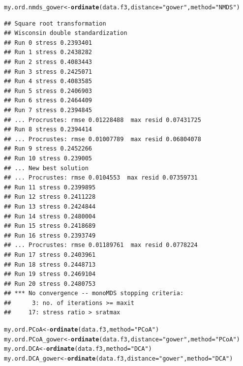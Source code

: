 \documentclass[12pt]{article}\usepackage[]{graphicx}\usepackage[]{color}
\makeatletter
\newcommand{\hlstr}[1]{\textcolor[rgb]{0.192,0.494,0.8}{#1}}%
\newcommand{\hlstd}[1]{\textcolor[rgb]{0.345,0.345,0.345}{#1}}%
\newcommand{\hlkwb}[1]{\textcolor[rgb]{0.69,0.353,0.396}{#1}}%
\newcommand{\hlkwc}[1]{\textcolor[rgb]{0.333,0.667,0.333}{#1}}%
\newcommand{\hlkwd}[1]{\textcolor[rgb]{0.737,0.353,0.396}{\textbf{#1}}}%
\newenvironment{kframe}{%
 \def\at@end@of@kframe{}%
 \ifinner\ifhmode%
  \def\at@end@of@kframe{\end{minipage}}%
  \begin{minipage}{\columnwidth}%
 \fi\fi%
 \def\FrameCommand##1{\hskip\@totalleftmargin \hskip-\fboxsep
 \colorbox{shadecolor}{##1}\hskip-\fboxsep
     \hskip-\linewidth \hskip-\@totalleftmargin \hskip\columnwidth}%
 \MakeFramed {\advance\hsize-\width
   \@totalleftmargin\z@ \linewidth\hsize
   \@setminipage}}%
 {\par\unskip\endMakeFramed%
 \at@end@of@kframe}
\newenvironment{knitrout}{}{} %
\numberwithin{figure}{section}
\makeatother
\begin{document}
\begin{knitrout}\small
{}\color{fgcolor}\begin{kframe}
\begin{alltt}
\hlstd{my.ord.nmds_gower} \hlkwb{<-} \hlkwd{ordinate}\hlstd{(data.f3,} \hlkwc{distance} \hlstd{=} \hlstr{"gower"}\hlstd{,}  \hlkwc{method} \hlstd{=} \hlstr{"NMDS"}\hlstd{)}
\end{alltt}
\begin{verbatim}
## Square root transformation
## Wisconsin double standardization
## Run 0 stress 0.2393401 
## Run 1 stress 0.2438282 
## Run 2 stress 0.4083443 
## Run 3 stress 0.2425071 
## Run 4 stress 0.4083585 
## Run 5 stress 0.2406903 
## Run 6 stress 0.2464409 
## Run 7 stress 0.2394845 
## ... Procrustes: rmse 0.01228488  max resid 0.07431725 
## Run 8 stress 0.2394414 
## ... Procrustes: rmse 0.01007789  max resid 0.06804078 
## Run 9 stress 0.2452266 
## Run 10 stress 0.239005 
## ... New best solution
## ... Procrustes: rmse 0.0104553  max resid 0.07359731 
## Run 11 stress 0.2399895 
## Run 12 stress 0.2411228 
## Run 13 stress 0.2424844 
## Run 14 stress 0.2480004 
## Run 15 stress 0.2418689 
## Run 16 stress 0.2393749 
## ... Procrustes: rmse 0.01189761  max resid 0.0778224 
## Run 17 stress 0.2403961 
## Run 18 stress 0.2448713 
## Run 19 stress 0.2469104 
## Run 20 stress 0.2480753 
## *** No convergence -- monoMDS stopping criteria:
##      3: no. of iterations >= maxit
##     17: stress ratio > sratmax
\end{verbatim}
\begin{alltt}
\hlstd{my.ord.PCoA} \hlkwb{<-} \hlkwd{ordinate}\hlstd{(data.f3,} \hlkwc{method} \hlstd{=} \hlstr{"PCoA"}\hlstd{)}
\hlstd{my.ord.PCoA_gower} \hlkwb{<-} \hlkwd{ordinate}\hlstd{(data.f3,} \hlkwc{distance} \hlstd{=} \hlstr{"gower"}\hlstd{,} \hlkwc{method} \hlstd{=} \hlstr{"PCoA"}\hlstd{)}
\hlstd{my.ord.DCA} \hlkwb{<-} \hlkwd{ordinate}\hlstd{(data.f3,} \hlkwc{method} \hlstd{=} \hlstr{"DCA"}\hlstd{)}
\hlstd{my.ord.DCA_gower} \hlkwb{<-} \hlkwd{ordinate}\hlstd{(data.f3,} \hlkwc{distance} \hlstd{=} \hlstr{"gower"}\hlstd{,} \hlkwc{method} \hlstd{=} \hlstr{"DCA"}\hlstd{)}


\end{alltt}
\end{kframe}
\end{knitrout}
\end{document}
